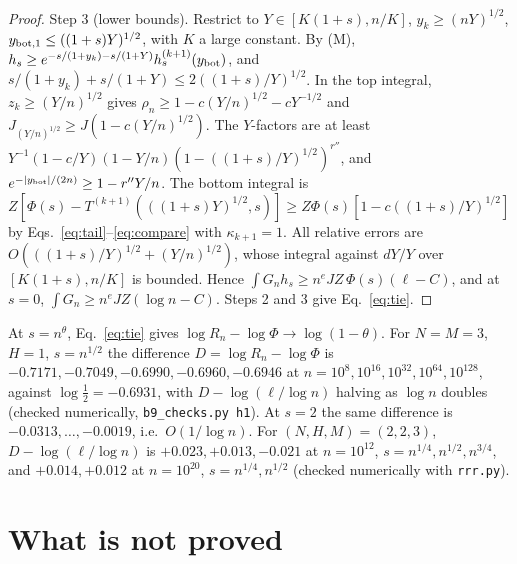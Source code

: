 \documentclass[11pt]{article}
\theoremstyle{remark}
\begin{document}
\begin{proof}
Step 3 (lower bounds).
Restrict to $Y\in[K(1+s),n/K]$, $y_k\ge(nY)^{1/2}$, $y_{{\rm bot},1}\le((1+s)Y)^{1/2}$, with $K$ a large constant.
By (M), $h_s\ge e^{-s/(1+y_k)-s/(1+Y)}h^{(k+1)}_s(y_{\rm bot})$, and $s/(1+y_k)+s/(1+Y)\le2((1+s)/Y)^{1/2}$.
In the top integral, $z_k\ge(Y/n)^{1/2}$ gives $\rho_n\ge1-c(Y/n)^{1/2}-cY^{-1/2}$ and $J_{(Y/n)^{1/2}}\ge J(1-c(Y/n)^{1/2})$.
The $Y$-factors are at least $Y^{-1}(1-c/Y)(1-Y/n)(1-((1+s)/Y)^{1/2})^{r''}$, and $e^{-\lvert y_{\rm bot}\rvert/(2n)}\ge1-r''Y/n$.
The bottom integral is $Z[\Phi(s)-T^{(k+1)}(((1+s)Y)^{1/2},s)]\ge Z\Phi(s)[1-c((1+s)/Y)^{1/2}]$ by Eqs.~\eqref{eq:tail}--\eqref{eq:compare} with $\kappa_{k+1}=1$.
All relative errors are $O(((1+s)/Y)^{1/2}+(Y/n)^{1/2})$, whose integral against $dY/Y$ over $[K(1+s),n/K]$ is bounded.
Hence $\int G_nh_s\ge n^eJZ\,\Phi(s)(\ell-C)$, and at $s=0$, $\int G_n\ge n^eJZ(\log n-C)$.
Steps 2 and 3 give Eq.~\eqref{eq:tie}.
\end{proof}

At $s=n^\theta$, Eq.~\eqref{eq:tie} gives $\log R_n-\log\Phi\to\log(1-\theta)$.
For $N=M=3$, $H=1$, $s=n^{1/2}$ the difference $D=\log R_n-\log\Phi$ is $-0.7171,-0.7049,-0.6990,-0.6960,-0.6946$ at $n=10^{8},10^{16},10^{32},10^{64},10^{128}$, against $\log\tfrac12=-0.6931$, with $D-\log(\ell/\log n)$ halving as $\log n$ doubles (checked numerically, \texttt{b9\_checks.py h1}).
At $s=2$ the same difference is $-0.0313,\dots,-0.0019$, i.e.\ $O(1/\log n)$.
For $(N,H,M)=(2,2,3)$, $D-\log(\ell/\log n)$ is $+0.023,+0.013,-0.021$ at $n=10^{12}$, $s=n^{1/4},n^{1/2},n^{3/4}$, and $+0.014,+0.012$ at $n=10^{20}$, $s=n^{1/4},n^{1/2}$ (checked numerically with \texttt{rrr.py}).

\section{What is not proved}
\end{document}
